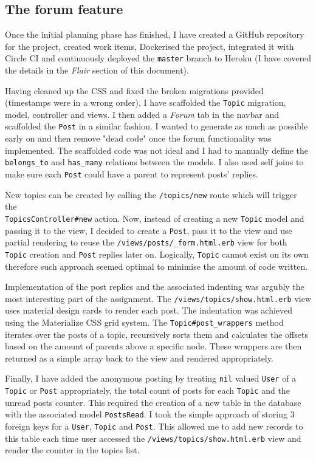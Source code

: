 \documentclass[a4paper, 11pt, titlepage]{article}
\begin{document}
\subsection{The forum feature}
Once the initial planning phase has finished, I have created a GitHub repository for the project,
created work items, Dockerised the project, integrated it with Circle CI and continuously deployed the \texttt{master}
branch to Heroku (I have covered the details in the \textit{Flair} section of this document).

Having cleaned up the CSS and fixed the broken migrations provided (timestamps were in a wrong order),
I have scaffolded the \texttt{Topic} migration, model, controller and views. I then added a
\textit{Forum} tab in the navbar and scaffolded the \texttt{Post} in a similar fashion. I wanted
to generate as much as possible early on and then remove "dead code" once the forum functionality
was implemented. The scaffolded code was not ideal and I had to manually define the \texttt{belongs\_to}
and \texttt{has\_many} relations between the models. I also used self joins to make sure each \texttt{Post}
could have a parent to represent posts' replies.

New topics can be created by calling the \texttt{/topics/new} route which will trigger the \\ \texttt{TopicsController\#new}
action. Now, instead of creating a new \texttt{Topic} model and passing it to the view, I decided to create
a \texttt{Post}, pass it to the view and use partial rendering to reuse the \texttt{/views/posts/\_form.html.erb}
view for both \texttt{Topic} creation and \texttt{Post} replies later on. Logically, \texttt{Topic} cannot exist on its own
therefore such approach seemed optimal to minimise the amount of code written.

Implementation of the post replies and the associated indenting was argubly the most interesting
part of the assignment. The \texttt{/views/topics/show.html.erb} view uses material design cards to
render each post. The indentation was achieved using the Materialize CSS\cite{1} grid system.
The \texttt{Topic\#post\_wrappers} method iterates over the posts of a topic, recursively sorts
them and calculates the offsets based on the amount of parents above a specific node. These wrappers
are then returned as a simple array back to the view and rendered appropriately.

Finally, I have added the anonymous posting by treating \texttt{nil} valued \texttt{User} of a \texttt{Topic} or \texttt{Post}
appropriately, the total count of posts for each \texttt{Topic} and the unread posts counter. This required the creation of a new
table in the database with the associated model \texttt{PostsRead}. I took the simple approach of storing 3 foreign keys
for a \texttt{User}, \texttt{Topic} and \texttt{Post}. This allowed me to add new records to this table each time user
accessed the \texttt{/views/topics/show.html.erb} view and render the counter in the topics list.
\end{document}
